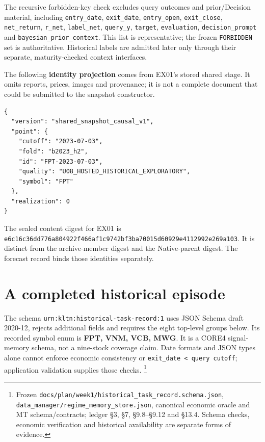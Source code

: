\endgroup

The recursive forbidden-key check excludes query outcomes and prior/Decision
material, including \texttt{entry\_\allowbreak{}date}, \texttt{exit\_\allowbreak{}date}, \texttt{entry\_\allowbreak{}open}, \texttt{exit\_\allowbreak{}close},
\texttt{net\_\allowbreak{}return}, \texttt{r\_\allowbreak{}net}, \texttt{label\_\allowbreak{}net}, \texttt{query\_\allowbreak{}y}, \texttt{target}, \texttt{evaluation},
\texttt{decision\_\allowbreak{}prompt} and \texttt{bayesian\_\allowbreak{}prior\_\allowbreak{}context}. This list is representative;
the frozen \texttt{FORBIDDEN} set is authoritative. Historical labels are admitted
later only through their separate, maturity-checked context interfaces.

The following \textbf{identity projection} comes from EX01's stored shared
stage. It omits reports, prices, images and provenance; it is not a complete
document that could be submitted to the snapshot constructor.

\begin{Verbatim}[fontsize=\small,breaklines=true,breakanywhere=true]
{
  "version": "shared_snapshot_causal_v1",
  "point": {
    "cutoff": "2023-07-03",
    "fold": "b2023_h2",
    "id": "FPT-2023-07-03",
    "quality": "U08_HOSTED_HISTORICAL_EXPLORATORY",
    "symbol": "FPT"
  },
  "realization": 0
}
\end{Verbatim}

The sealed content digest for EX01 is
\texttt{e6c16c36\allowbreak{}dd776a80\allowbreak{}4922f466\allowbreak{}af1c9742\allowbreak{}bf3ba700\allowbreak{}15d60929\allowbreak{}e4112992\allowbreak{}e269a103}.
It is distinct from the archive-member digest and the Native-parent digest.
The forecast record binds those identities separately.

\section{A completed historical episode}\label{s:7f53136d63fe1141}

The schema \texttt{urn:\allowbreak{}kltn:\allowbreak{}historical-\allowbreak{}task-\allowbreak{}record:\allowbreak{}1} uses JSON Schema draft
2020-12, rejects additional fields and requires the eight top-level groups
below. Its recorded symbol enum is \textbf{FPT, VNM, VCB, MWG}. It is a
CORE4 signal-memory schema, not a nine-stock coverage claim. Date formats
and JSON types alone cannot enforce economic consistency or
\texttt{exit\_\allowbreak{}date < query cutoff}; application validation supplies those checks.
\footnote{Frozen \texttt{docs/\allowbreak{}plan/\allowbreak{}week1/\allowbreak{}historical\_\allowbreak{}task\_\allowbreak{}record.\allowbreak{}schema.\allowbreak{}json}, \texttt{data\_\allowbreak{}manager/\allowbreak{}regime\_\allowbreak{}memory\_\allowbreak{}store.\allowbreak{}json}, canonical economic oracle and MT schema/contracts; ledger §3, §7, §9.8--§9.12 and §13.4. Schema checks, economic verification and historical availability are separate forms of evidence.}


